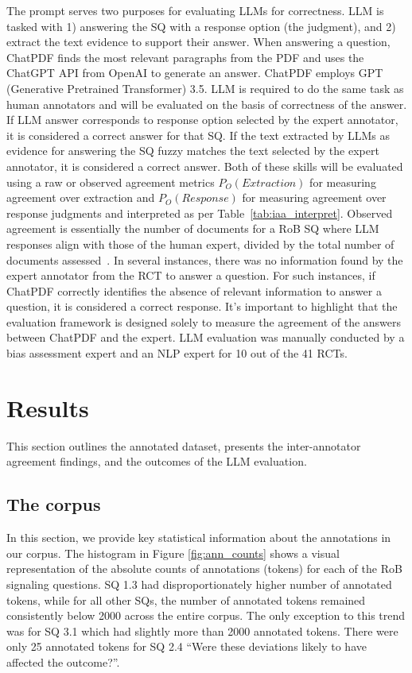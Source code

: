 \documentclass[sn-mathphys,Numbered]{sn-jnl}%
\theoremstyle{thmstyleone}%
\theoremstyle{thmstyletwo}%
\theoremstyle{thmstylethree}%
\begin{document}
The prompt serves two purposes for evaluating LLMs for correctness.
LLM is tasked with 1) answering the SQ with a response option (the judgment), and 2) extract the text evidence to support their answer.
When answering a question, ChatPDF finds the most relevant paragraphs from the PDF and uses the ChatGPT API from OpenAI to generate an answer.
ChatPDF employs GPT (Generative Pretrained Transformer) 3.5.
LLM is required to do the same task as human annotators and will be evaluated on the basis of correctness of the answer.
If LLM answer corresponds to response option selected by the expert annotator, it is considered a correct answer for that SQ. 
If the text extracted by LLMs as evidence for answering the SQ fuzzy matches the text selected by the expert annotator, it is considered a correct answer.
Both of these skills will be evaluated using a raw or observed agreement metrics $P_{O} (Extraction)$  for measuring agreement over extraction and $P_{O} (Response)$ for measuring agreement over response judgments and interpreted as per Table~\ref{tab:iaa_interpret}. 
Observed agreement is essentially the number of documents for a RoB SQ where LLM responses align with those of the human expert, divided by the total number of documents assessed~\cite{artstein2017inter}.
In several instances, there was no information found by the expert annotator from the RCT to answer a question. 
For such instances, if ChatPDF correctly identifies the absence of relevant information to answer a question, it is considered a correct response.
It's important to highlight that the evaluation framework is designed solely to measure the agreement of the answers between ChatPDF and the expert.
LLM evaluation was manually conducted by a bias assessment expert and an NLP expert for 10 out of the 41 RCTs.
%
%
%
\section{Results}
\label{sec:results}
%
This section outlines the annotated dataset, presents the inter-annotator agreement findings, and the outcomes of the LLM evaluation.
%
%
%
\subsection{The corpus}
\label{subsec:corpus}
%
In this section, we provide key statistical information about the annotations in our corpus.
The histogram in Figure \ref{fig:ann_counts} shows a visual representation of the absolute counts of annotations (tokens) for each of the RoB signaling questions.
SQ 1.3 had disproportionately higher number of annotated tokens, while for all other SQs, the number of annotated tokens remained consistently below 2000 across the entire corpus.
The only exception to this trend was for SQ 3.1 which had slightly more than 2000 annotated tokens.
There were only 25 annotated tokens for SQ 2.4 ``Were these deviations likely to have affected the outcome?''.
\end{document}

